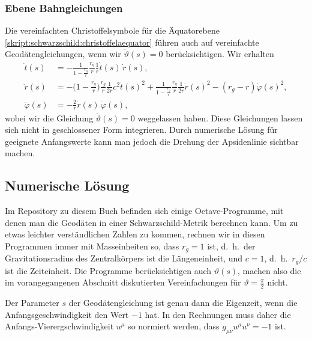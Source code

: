 \subsubsection{Ebene Bahngleichungen}
Die vereinfachten Christoffelsymbole für die Äquatorebene
\eqref{skript:schwarzschild:christoffelaequator}
führen auch auf vereinfachte Geodätengleichungen, wenn wir $\dot\vartheta(s)=0$
berücksichtigen.
Wir erhalten
\begin{align*}
\ddot t(s)
&=
-\frac{1}{1-\displaystyle\frac{r_g}{r}}\frac{r_g}{r}\frac{1}{r}\dot t(s)\,\dot r(s),
\\
\ddot r(s)
&=
-\biggl(1-\frac{r_g}{r}\biggr)\frac{r_g}{r}\frac1{2r}c^2\dot t(s)^2
+\frac{1}{1-\displaystyle\frac{r_g}{r}} \frac{r_g}{r}\frac1{2r}\dot r(s)^2
- (r_g-r) \dot\varphi(s)^2,
\\
\ddot \varphi(s)
&=
-\frac2r \dot r(s)\,\dot\varphi(s),
\end{align*}
wobei wir die Gleichung $\ddot\vartheta(s) = 0$ weggelassen haben.
Diese Gleichungen lassen sich nicht in geschlossener Form integrieren.
Durch numerische Lösung für geeignete Anfangswerte kann man jedoch die
Drehung der Apsidenlinie sichtbar machen.

\subsection{Numerische Lösung}
Im Repository zu diesem Buch befinden sich einige Octave-Programme,
mit denen man die Geodäten in einer Schwarzschild-Metrik berechnen kann.
Um zu etwas leichter verständlichen Zahlen zu kommen, rechnen wir
in diesen Programmen immer mit Masseinheiten so, dass $r_g=1$ ist,
d.~h.~der Gravitationsradius des Zentralkörpers ist die Längeneinheit,
und $c=1$, d.~h.~$r_g/c$ ist die Zeiteinheit.
Die Programme berücksichtigen auch $\vartheta(s)$, machen also die 
im vorangegangenen Abschnitt diskutierten Vereinfachungen für
$\vartheta=\frac{\pi}2$ nicht.

Der Parameter $s$ der Geodätengleichung ist genau dann die Eigenzeit,
wenn die Anfangsgeschwindigkeit den Wert $-1$ hat.
In den Rechnungen muss daher die Anfangs-Vierergschwindigkeit $u^\mu$
so normiert werden, dass $g_{\mu\nu}u^\mu u^\nu=-1$ ist.

